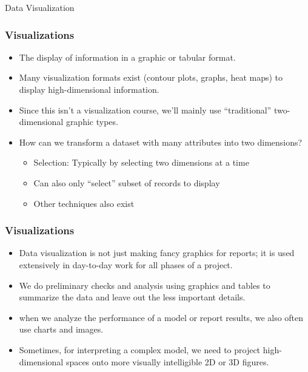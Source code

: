 \begin{frame}
  \begin{center}
    {\Large Data Visualization}
  \end{center}
\end{frame}


\begin{frame}[fragile]\frametitle{Visualizations}	
\begin{itemize}
\item The display of information in a graphic or tabular format.
\item Many visualization formats exist (contour plots, graphs, heat maps) to display high-dimensional information.
\item Since this isn't a visualization course, we'll mainly use ``traditional'' two-dimensional graphic types.
\item How can we transform a dataset with many attributes into two dimensions?
\begin{itemize}
\item Selection: Typically by selecting two dimensions at a time
\item Can also only ``select'' subset of records to display
\item Other techniques also exist
\end{itemize}
\end{itemize}
\end{frame}

\begin{frame}[fragile]\frametitle{Visualizations}	
\begin{itemize}
\item Data visualization is not just making fancy graphics for reports; it is used extensively in day-to-day work for all phases of a project.
\item We do preliminary checks and analysis using graphics and tables to summarize the data and leave out the less important details.
\item when we analyze the performance of a model or report results, we also often use charts and images. 
\item Sometimes, for interpreting a complex model, we need to project high-dimensional spaces onto more visually intelligible 2D or 3D figures.
\end{itemize}
\end{frame}

